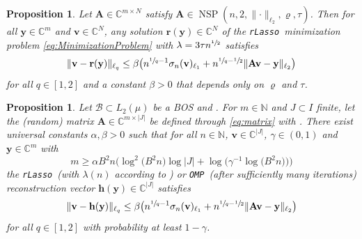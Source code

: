 \documentclass[10pt,a4paper]{amsart}
\newtheorem{prop}[theorem]{Proposition}
\newcommand{\rlasso}{\texttt{rLasso}}
\newcommand{\omp}{\texttt{OMP}}
\begin{document}
\begin{prop}\label{prop:rLasso_for_NSP} Let $\mathbf{A} \in \mathbb{C}^{m\times N}$ satisfy $\mathbf{A}\in\operatorname{NSP}(n,2,\lVert\cdot\rVert_{\ell_2},\varrho,\tau)$.
Then for all $\mathbf{y} \in \mathbb{C}^m$ and $\mathbf{v} \in \mathbb{C}^{N}$, any solution $\mathbf{r}(\mathbf{y}) \in \mathbb{C}^{N}$ of the \rlasso \ minimization problem \eqref{eq:MinimizationProblem} with $\lambda = 3\tau n^{\sfrac{1}{2}}$ satisfies
\begin{equation}\label{eq:rLasso_NSP_lq}
	\lVert\mathbf{v}- \mathbf{r}(\mathbf{y}) \rVert_{\ell_q} \leq \beta\bigl(n^{\sfrac{1}{q}-1}\sigma_n(\mathbf{v})_{\ell_1} + n^{\sfrac{1}{q}-\sfrac{1}{2}}  \lVert\mathbf{A}\mathbf{v}-\mathbf{y}\rVert_{\ell_2}\bigr)
\end{equation}
for all $q\in[1,2]$ and a constant $\beta>0$ that depends only on $\varrho$ and $\tau$.
\end{prop}

\begin{prop}\label{prop:Recovery_vector_errors}
Let $\mathcal{B} \subset L_2(\mu)$ be a BOS and .
For $m\in\mathbb{N}$ and $J\subset I$ finite, let the (random) matrix $\mathbf{A}\in\mathbb{C}^{m\times\lvert J\rvert}$ be defined through \eqref{eq:matrix} with .
There exist universal constants $\alpha, \beta>0$ such that for all $n \in \mathbb{N}$, $\mathbf{v} \in \mathbb{C}^{\lvert J\rvert}$, $\gamma \in (0,1)$ and ${\mathbf{y}} \in \mathbb{C}^m$ with 
\begin{equation}\label{eq:NumberSamples}
	m \geq \alpha B^2 n \bigl({\log^2} \bigl(B^2n\bigr) \log\lvert J\rvert + \log\bigl(\gamma^{-1}\log\bigl(B^2n\bigr)\bigr)\bigr)
\end{equation}
the \rlasso \ (with $\lambda(n)$ according to ) or \omp \ (after sufficiently many iterations) reconstruction vector $\mathbf{h}(\mathbf{y})\in\mathbb{C}^{\lvert J\rvert}$ satisfies
\begin{equation}\label{eq:Recovery_lq_error}
    \lVert \mathbf{v} - \mathbf{h}(\mathbf{y}) \rVert_{\ell_q} \leq \beta\bigl(n^{\sfrac{1}{q}-1}\sigma_n(\mathbf{v})_{\ell_1} + n^{\sfrac{1}{q}-\sfrac{1}{2}}  \lVert\mathbf{A}\mathbf{v}-\mathbf{y}\rVert_{\ell_2}\bigr)
\end{equation}
for all $q\in[1,2]$ with probability at least $1 - \gamma$.
\end{prop}
\end{document}
